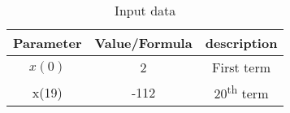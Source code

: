 \begin{table}[h]
\renewcommand\thetable{1}
    \centering
    \begin{tabular}{|c|c|c|}
        \hline
        \textbf{Parameter} & \textbf{Value/Formula} & \textbf{description}\\
        \hline
        \(x(0)\) & 2 & First term\\
        \hline
        x(19) & -112 & 20\textsuperscript{th} term\\
        \hline
    \end{tabular}
    \caption{Input data}
  \label{input data}
\end{table}
